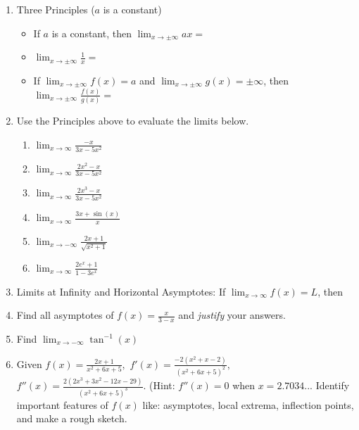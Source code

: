 \documentclass[11pt,fleqn]{article}
\begin{document}
\setlength{\parindent}{0cm}
\renewcommand{\headrulewidth}{0pt}
\newcommand{\blank}[1]{\rule{#1}{0.75pt}}
\renewcommand{\d}{\displaystyle}
\vspace*{-0.7in}
\begin{center}
 {\large{ }}
\end{center}
 \begin{enumerate}
 \item Three Principles ($a$ is a constant)
 \begin{itemize}
 	\item If $a$ is a constant, then $\displaystyle{\lim_{x \to \pm\infty} ax=}$
 	\item $\displaystyle{\lim_{x \to \pm\infty} \frac{1}{x}=}$
	\item If $\displaystyle{\lim_{x \to \pm\infty} f(x)=a}$ and $\displaystyle{\lim_{x \to \pm\infty} {g(x)}= \pm \infty}$, then  $\displaystyle{\lim_{x \to \pm\infty} \frac{f(x)}{g(x)}=}$
 \end{itemize}
 \item Use the Principles above to evaluate the limits below.
 	\begin{enumerate}
	\item $\displaystyle{\lim_{x \to \infty} \frac{-x}{3x-5x^2}}$
	\vfill
	\item $\displaystyle{\lim_{x \to \infty} \frac{2x^2-x}{3x-5x^2}}$
	\vfill
	\item $\displaystyle{\lim_{x \to \infty} \frac{2x^3-x}{3x-5x^2}}$
	\vfill
	\item $\displaystyle{\lim_{x \to \infty} \frac{3x+ \sin(x)}{x}}$
	\vfill
	\item $\displaystyle{\lim_{x \to -\infty} \frac{2x+1}{\sqrt{x^2+1}}}$
	\vfill
	\item $\displaystyle{\lim_{x \to \infty} \frac{2e^x+1}{1-3e^x}}$
	\vfill
		\end{enumerate}
 \newpage
 \item Limits at Infinity and Horizontal Asymptotes: If $\displaystyle{\lim_{x \to \infty}f(x) =L}$, then\\
 
 \item Find all asymptotes of $f(x)=\frac{x}{3-x}$ and \emph{justify} your answers.
 \vfill
 \item Find $\displaystyle{\lim_{x \to -\infty} \tan^{-1}(x)}$
 \vspace{1in}
 \item Given $f(x)=\frac{2x+1}{x^2+6x+5},$ $f'(x)=\frac{-2(x^2+x-2)}{(x^2+6x+5)^2},$ $f''(x)= \frac{2(2x^3+3x^2-12x-29)}{(x^2+6x+5)^3}.$ (Hint: $f''(x)=0$ when $x = 2.7034...$ Identify important features of $f(x)$ like: asymptotes, local extrema, inflection points, and make a rough sketch.
 \vfill
 \end{enumerate}
\end{document}
